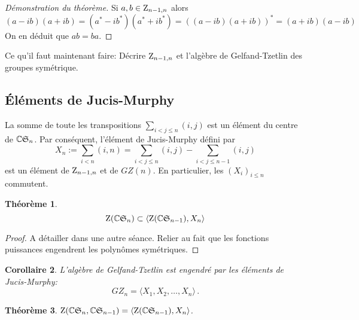 \documentclass[francais,a4paper,11pt,reqno]{amsart}
\theoremstyle{plain}
\newtheorem{THEO}{\bf Théorème}[section]
\newtheorem{COR}[THEO]{\bf Corollaire}
\theoremstyle{definition}
\theoremstyle{remark}
\begin{document}
\begin{proof}[Démonstration du théorème]
  Si $a,b\in\operatorname{Z}_{n-1,n}$ alors
  \begin{equation}
    (a-ib)(a+ib) = (a^*-ib^*)(a^*+ib^*) =  ((a-ib)(a+ib))^* = (a+ib)(a-ib)
  \end{equation}
  On en déduit que $ab=ba$.
\end{proof}

Ce qu'il faut maintenant faire: Décrire $\operatorname{Z}_{n-1,n}$ et l'algèbre de
Gelfand-Tzetlin des groupes symétrique.

\subsection{Éléments de Jucis-Murphy}

La somme de toute les transpositions $\sum_{i<j\leq n} (i,j)$ est un élément du
centre de ${\mathbb C}{\mathfrak S}_n$. Par conséquent, l'élément de Jucis-Murphy défini par
\begin{equation}
  X_n := \sum_{i<n} (i,n) = \sum_{i<j\leq n} (i,j) - \sum_{i<j\leq n-1} (i,j)
\end{equation}
est un élément de $\operatorname{Z}_{n-1,n}$ et de $GZ(n)$. En particulier, les
$(X_i)_{i\leq n}$ commutent.
\begin{THEO}
  \begin{equation}
    \operatorname{Z}({\mathbb C}{\mathfrak S}_n) \subset \langle \operatorname{Z}({\mathbb C}{\mathfrak S}_{n-1}), X_n\rangle
  \end{equation}
\end{THEO}
\begin{proof}
  A détailler dans une autre séance. Relier au fait que les fonctions
  puissances engendrent les polynômes symétriques.
\end{proof}
\begin{COR}
  L'algèbre de Gelfand-Tzetlin est engendré par les éléments de Jucis-Murphy:
  \begin{equation}
    GZ_n = \langle X_1, X_2, \dots, X_n \rangle\,.
  \end{equation}
\end{COR}
\begin{THEO}
  $\operatorname{Z}({\mathbb C} {\mathfrak S}_n, {\mathbb C} {\mathfrak S}_{n-1}) =
  \langle \operatorname{Z}({\mathbb C}{\mathfrak S}_{n-1}), X_n\rangle$.
\end{THEO}
\end{document}
